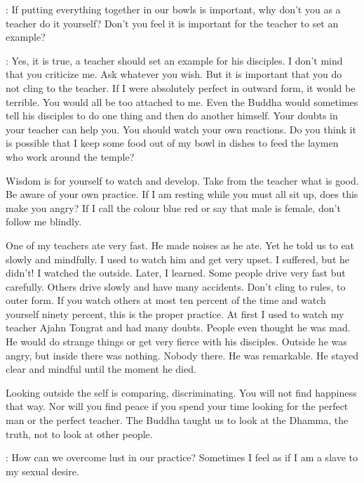 :
If putting everything together in our bowls is important, why don't you as a teacher do it yourself? Don't you feel it is important for the teacher to set an example?

: Yes, it is true, a teacher should set an example for his disciples. I don't mind that you criticize me. Ask whatever you wish. But it is important that you do not cling to the teacher. If I were absolutely perfect in outward form, it would be terrible. You would all be too attached to me. Even the Buddha would sometimes tell his disciples to do one thing and then do another himself. Your doubts in your teacher can help you. You should watch your own reactions. Do you think it is possible that I keep some food out of my bowl in dishes to feed the laymen who work around the temple?

Wisdom is for yourself to watch and develop. Take from the teacher what is good. Be aware of your own practice. If I am resting while you must all sit up, does this make you angry? If I call the colour blue red or say that male is female, don't follow me blindly.

One of my teachers ate very fast. He made noises as he ate. Yet he told us to eat slowly and mindfully. I used to watch him and get very upset. I suffered, but he didn't! I watched the outside. Later, I learned. Some people drive very fast but carefully. Others drive slowly and have many accidents. Don't cling to rules, to outer form. If you watch others at most ten percent of the time and watch yourself ninety percent, this is the proper practice. At first I used to watch my teacher Ajahn Tongrat and had many doubts. People even thought he was mad. He would do strange things or get very fierce with his disciples. Outside he was angry, but inside there was nothing. Nobody there. He was remarkable. He stayed clear and mindful until the moment he died.

Looking outside the self is comparing, discriminating. You will not find happiness that way. Nor will you find peace if you spend your time looking for the perfect man or the perfect teacher. The Buddha taught us to look at the Dhamma, the truth, not to look at other people.

:
How can we overcome lust in our practice? Sometimes I feel as if I am a slave to my sexual desire.

